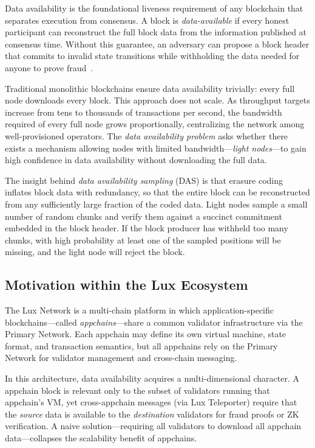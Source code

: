 \documentclass[11pt,a4paper]{article}
\theoremstyle{plain}
\theoremstyle{definition}
\theoremstyle{remark}
\begin{document}
Data availability is the foundational liveness requirement of any blockchain that separates
execution from consensus. A block is \emph{data-available} if every honest participant can
reconstruct the full block data from the information published at consensus time. Without
this guarantee, an adversary can propose a block header that commits to invalid state
transitions while withholding the data needed for anyone to prove fraud~\cite{albassam2018fraud}.

Traditional monolithic blockchains ensure data availability trivially: every full node
downloads every block. This approach does not scale. As throughput targets increase from
tens to thousands of transactions per second, the bandwidth required of every full node
grows proportionally, centralizing the network among well-provisioned operators. The
\emph{data availability problem} asks whether there exists a mechanism allowing nodes with
limited bandwidth---\emph{light nodes}---to gain high confidence in data availability without
downloading the full data.

The insight behind \emph{data availability sampling} (DAS) is that erasure coding inflates
block data with redundancy, so that the entire block can be reconstructed from any sufficiently
large fraction of the coded data. Light nodes sample a small number of random chunks and
verify them against a succinct commitment embedded in the block header. If the block producer
has withheld too many chunks, with high probability at least one of the sampled positions
will be missing, and the light node will reject the block.

\subsection{Motivation within the Lux Ecosystem}

The Lux Network is a multi-chain platform in which application-specific blockchains---called
\emph{appchains}---share a common validator infrastructure via the Primary Network. Each appchain
may define its own virtual machine, state format, and transaction semantics, but all appchains
rely on the Primary Network for validator management and cross-chain messaging.

In this architecture, data availability acquires a multi-dimensional character. A appchain block
is relevant only to the subset of validators running that appchain's VM, yet cross-appchain
messages (via Lux Teleporter) require that the \emph{source} data is available to the
\emph{destination} validators for fraud proofs or ZK verification. A naive solution---requiring
all validators to download all appchain data---collapses the scalability benefit of appchains.
\end{document}
